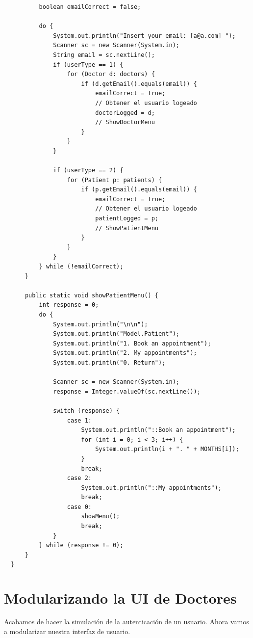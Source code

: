 \documentclass{article}
\begin{document}
\begin{verbatim}
          boolean emailCorrect = false;

          do {
              System.out.println("Insert your email: [a@a.com] ");
              Scanner sc = new Scanner(System.in);
              String email = sc.nextLine();
              if (userType == 1) {
                  for (Doctor d: doctors) {
                      if (d.getEmail().equals(email)) {
                          emailCorrect = true;
                          // Obtener el usuario logeado
                          doctorLogged = d;
                          // ShowDoctorMenu
                      }
                  }
              }

              if (userType == 2) {
                  for (Patient p: patients) {
                      if (p.getEmail().equals(email)) {
                          emailCorrect = true;
                          // Obtener el usuario logeado
                          patientLogged = p;
                          // ShowPatientMenu
                      }
                  }
              }
          } while (!emailCorrect);
      }

      public static void showPatientMenu() {
          int response = 0;
          do {
              System.out.println("\n\n");
              System.out.println("Model.Patient");
              System.out.println("1. Book an appointment");
              System.out.println("2. My appointments");
              System.out.println("0. Return");

              Scanner sc = new Scanner(System.in);
              response = Integer.valueOf(sc.nextLine());

              switch (response) {
                  case 1:
                      System.out.println("::Book an appointment");
                      for (int i = 0; i < 3; i++) {
                          System.out.println(i + ". " + MONTHS[i]);
                      }
                      break;
                  case 2:
                      System.out.println("::My appointments");
                      break;
                  case 0:
                      showMenu();
                      break;
              }
          } while (response != 0);
      }
  }
\end{verbatim}



\section{Modularizando la UI de Doctores}%
Acabamos de hacer la simulación de la autenticación de un usuario. Ahora vamos
a modularizar nuestra interfaz de usuario.\\
\end{document}
